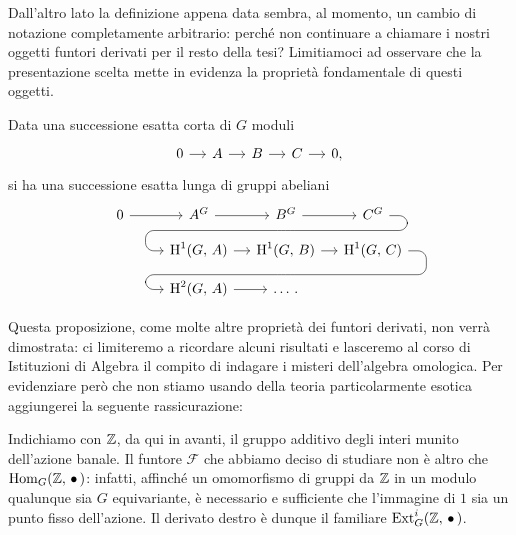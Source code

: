 Dall'altro lato la definizione appena data sembra, al momento, un cambio di notazione completamente arbitrario: perché non continuare a chiamare i nostri oggetti funtori derivati per il resto della tesi? Limitiamoci ad osservare che la presentazione scelta mette in evidenza la proprietà fondamentale di questi oggetti.

\begin{theorem}\label{fond} 
	Data una successione esatta corta di $ G $ moduli
	\[\begin{tikzcd}[column sep = small]
	0 \rar & A \rar & B \rar & C \rar & 0,
	\end{tikzcd}\]
	si ha una successione esatta lunga di gruppi abeliani
	\[\begin{tikzcd}[column sep = small, row sep = small]
	0 \rar & A^G \rar & B^G \arrow[d,phantom, ""{coordinate, name=Z}] \rar & C^G \arrow[dll, 
	rounded corners = 6 pt, 
	to path={ --([xshift=3ex]\tikztostart.east)
		|- (Z)[near end]\tikztonodes
		-| ([xshift=-3ex]\tikztotarget.west)
		-- (\tikztotarget)}] \\
	\qquad \quad &\HH^1(G, \, A) \rar & \HH^1(G, \, B) \arrow[d,phantom, ""{coordinate, name=W}] \rar & \HH^1(G, \, C) \arrow[dll, 
	rounded corners = 6 pt, 
	to path={ --([xshift=3ex]\tikztostart.east)
		|- (W)[near end]\tikztonodes
		-| ([xshift=-3ex]\tikztotarget.west)
		-- (\tikztotarget)}]  \\
	&\HH^2(G, \, A) \rar & \dots \, .
	& \end{tikzcd}\]
\end{theorem}

Questa proposizione, come molte altre proprietà dei funtori derivati, non verrà dimostrata: ci limiteremo a ricordare alcuni risultati e lasceremo al corso di Istituzioni di Algebra il compito di indagare i misteri dell'algebra omologica. Per evidenziare però che non stiamo usando della teoria particolarmente esotica aggiungerei la seguente rassicurazione:

\begin{remark}
	Indichiamo con $ \mathbb{Z} $, da qui in avanti, il gruppo additivo degli interi munito dell'azione banale.  Il funtore $ \mathcal{F} $ che abbiamo deciso di studiare non è altro che $ \operatorname{Hom}_G(\mathbb{Z},\, \bullet\,) $: infatti, affinché un omomorfismo di gruppi da $ \mathbb{Z} $ in un modulo qualunque sia $ G $ equivariante, è necessario e sufficiente che l'immagine di $ 1 $ sia un punto fisso dell'azione. Il derivato destro è dunque il familiare $ \operatorname{Ext}^i_G(\mathbb{Z}, \, \bullet\,) $.
\end{remark}

